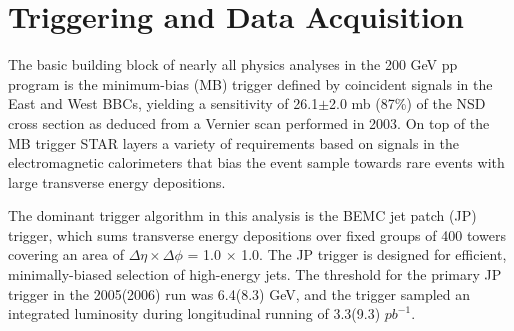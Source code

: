 \section{Triggering and Data Acquisition}

The basic building block of nearly all physics analyses in the 200 GeV pp program is the minimum-bias (MB) trigger defined by coincident signals in the East and West BBCs, yielding a sensitivity of 26.1$\pm$2.0 mb (87\%) of the NSD cross section as deduced from a Vernier scan performed in 2003. On top of the MB trigger STAR layers a variety of requirements based on signals in the electromagnetic calorimeters that bias the event sample towards rare events with large transverse energy depositions.

The dominant trigger algorithm in this analysis is the BEMC jet patch (JP) trigger, which sums transverse energy depositions over fixed groups of 400 towers covering an area of $\Delta \eta \times \Delta \phi$ = 1.0 $\times$ 1.0.  The JP trigger is designed for efficient, minimally-biased selection of high-energy jets.  The threshold for the primary JP trigger in the 2005(2006) run was 6.4(8.3) GeV, and the trigger sampled an integrated luminosity during longitudinal running of 3.3(9.3) $pb^{-1}$.







